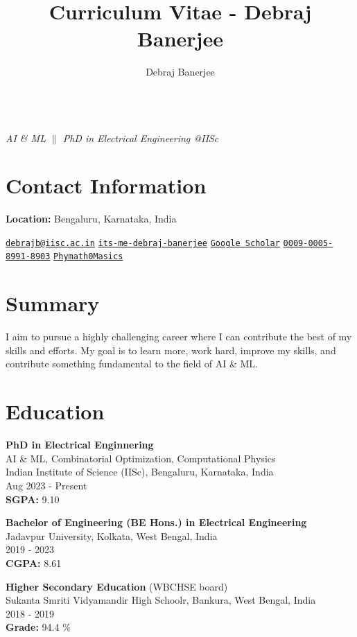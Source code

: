 \documentclass[a4paper,10pt]{article}
\makeatletter
\renewcommand{\maketitle}{
\begin{center}
{\Huge\bfseries\theauthor} \\
\vspace{0.25em}
\textit{AI \& ML \(\|\) PhD in Electrical Engineering @IISc} \\
\vspace{0.5em}
\end{center}
}
\makeatother
\begin{document}
\title{Curriculum Vitae - Debraj Banerjee}
\author{Debraj Banerjee}

\maketitle

\section*{Contact Information}
\textbf{Location:} Bengaluru, Karnataka, India 

{\faEnvelope}{\href{mailto:debrajb@iisc.ac.in}{\texttt{debrajb@iisc.ac.in}}}
{\faLinkedin}{\href{http://www.linkedin.com/in/its-me-debraj-banerjee}{\texttt{its-me-debraj-banerjee}}}
{\faGraduationCap}{\href{https://scholar.google.com/citations?user=egUqH7wAAAAJ&hl=en}{\texttt{Google Scholar}}}
{\faOrcid}{\href{https://orcid.org/0009-0005-8991-8903}{\texttt{0009-0005-8991-8903}}}
{\faGithub}{\href{https://github.com/Phymath0Masics}{\texttt{Phymath0Masics}}}



\section*{Summary}
I aim to pursue a highly challenging career where I can contribute the best of my skills and efforts. My goal is to learn more, work hard, improve my skills, and contribute something fundamental to the field of AI \& ML.

\section*{Education}
\textbf{PhD in Electrical Enginnering} \\
AI \& ML, Combinatorial Optimization, Computational Physics \\
Indian Institute of Science (IISc), Bengaluru, Karnataka, India \\
Aug 2023 - Present \\ 
\textbf{SGPA:} 9.10

\textbf{Bachelor of Engineering (BE Hons.) in Electrical Engineering} \\
Jadavpur University, Kolkata, West Bengal, India \\
2019 - 2023 \\
\textbf{CGPA:} 8.61

\textbf{Higher Secondary Education} (WBCHSE board) \\
Sukanta Smriti Vidyamandir High Schoolr, Bankura, West Bengal, India \\
2018 - 2019 \\
\textbf{Grade:} 94.4 \%
\end{document}
